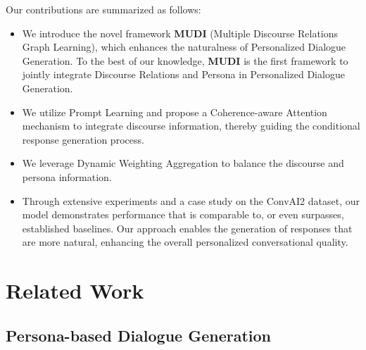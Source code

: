 \documentclass[letterpaper]{article} %
\begin{document}
Our contributions are summarized as follows:
\begin{itemize}
    \item We introduce the novel framework \textbf{MUDI} (Multiple Discourse Relations Graph Learning), which enhances the naturalness of Personalized Dialogue Generation. To the best of our knowledge, \textbf{MUDI} is the first framework to jointly integrate Discourse Relations and Persona in Personalized Dialogue Generation.
    
    \item We utilize Prompt Learning and propose a Coherence-aware Attention mechanism to integrate discourse information, thereby guiding the conditional response generation process.

    \item We leverage Dynamic Weighting Aggregation to balance the discourse and persona information. 
    
    \item Through extensive experiments and a case study on the ConvAI2 dataset, our model demonstrates performance that is comparable to, or even surpasses, established baselines. Our approach enables the generation of responses that are more natural, enhancing the overall personalized conversational quality.
\end{itemize}

\section{Related Work}

\subsection{Persona-based Dialogue Generation}
\end{document}
